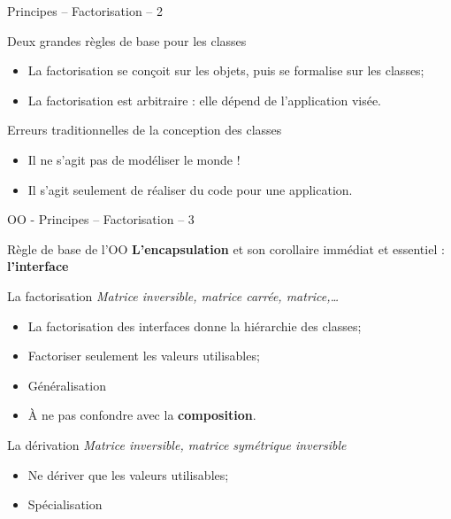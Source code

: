 \documentclass[compress,10pt,aspectratio=169]{beamer}
\begin{document}
    \begin{frame}{Principes -- Factorisation -- 2}
    \scriptsize
    \begin{block}{\small Deux grandes règles de base pour les classes}
    \begin{itemize}
    \item La factorisation se conçoit sur les objets, puis se formalise sur les classes;
    \item La factorisation est arbitraire : elle dépend de l'application visée.
    \end{itemize}
    \end{block}
    
    \begin{alertblock}{\small Erreurs traditionnelles de la conception des classes}
    \begin{itemize}
    \item Il ne s'agit pas de modéliser le monde !
    \item Il s'agit seulement de réaliser du code pour une application.
    \end{itemize}
    \end{alertblock}
    \end{frame}
    
    \begin{frame}{OO - Principes -- Factorisation -- 3}
    \scriptsize
    \begin{block}{\small Règle de base de l'OO}
    \textbf{L'encapsulation} et son corollaire immédiat et essentiel : \textbf{l'interface}
    \end{block}
    \vspace*{-2mm}
    \begin{block}{\small La factorisation}
    \textsl{Matrice inversible, matrice carrée, matrice,\ldots}\\
    \begin{itemize}
    \item La factorisation des interfaces donne la hiérarchie des classes;
    \item Factoriser seulement les valeurs utilisables;
    \item Généralisation
    \item À ne pas confondre avec la \textbf{composition}.
    \end{itemize}
    \end{block}
    \vspace*{-2mm}
    
    \begin{block}{\small La dérivation}
    \textsl{Matrice inversible, matrice symétrique inversible}
    \begin{itemize}
    \item Ne dériver que les valeurs utilisables;
    \item Spécialisation
    \end{itemize}
    \end{block}
    \end{frame}
\end{document}
